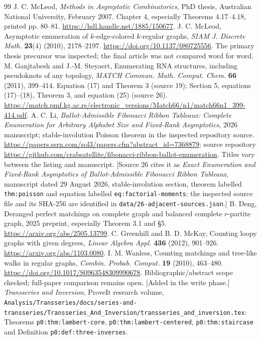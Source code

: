 \documentclass[11pt,letterpaper]{article}
\theoremstyle{remark}\newtheorem{remark}[theorem]{Remark}
\begin{document}
\begin{thebibliography}{99}
 J. C. McLeod, \emph{Methods in Asymptotic Combinatorics}, PhD thesis, Australian National University, February 2007. Chapter 4, especially Theorems 4.17--4.18, printed pp. 80--81. \url{https://hdl.handle.net/1885/150677}.
 J. C. McLeod, Asymptotic enumeration of $k$-edge-colored $k$-regular graphs, \emph{SIAM J. Discrete Math.} \textbf{23}(4) (2010), 2178--2197. \url{https://doi.org/10.1137/080725556}. The primary thesis precursor was inspected; the final article was not compared word for word.
 M. Ganjtabesh and J.-M. Steyaert, Enumerating RNA structures, including pseudoknots of any topology, \emph{MATCH Commun. Math. Comput. Chem.} \textbf{66} (2011), 399--414. Equation (17) and Theorem 3 (source 19); Section 5, equations (17)--(18), Theorem 3, and equation (25) (source 26). \url{https://match.pmf.kg.ac.rs/electronic_versions/Match66/n1/match66n1_399-414.pdf}.
 A. C. Li, \emph{Ballot-Admissible Fibonacci Ribbon Tableaux: Complete Enumeration for Arbitrary Alphabet Size and Fixed-Rank Asymptotics}, 2026 manuscript; stable-involution Poisson theorem in the inspected repository source. \url{https://papers.ssrn.com/sol3/papers.cfm?abstract_id=7368879}; source repository \url{https://github.com/crabsatellite/fibonacci-ribbon-ballot-enumeration}. Titles vary between the listing and manuscript. [Source 26 cites it as \emph{Exact Enumeration and Fixed-Rank Asymptotics of Ballot-Admissible Fibonacci Ribbon Tableaux}, manuscript dated 29 August 2026, stable-involution section, theorem labelled \texttt{thm:poisson} and equation labelled \texttt{eq:factorial-moments}; the inspected source file and its SHA-256 are identified in \texttt{data/26-adjacent-sources.json}.]
 B. Deng, Deranged perfect matchings on complete graph and balanced complete $r$-partite graph, 2025 preprint, especially Theorem 3.1 and \S5. \url{https://arxiv.org/abs/2505.13799}.
 C. Greenhill and B. D. McKay, Counting loopy graphs with given degrees, \emph{Linear Algebra Appl.} \textbf{436} (2012), 901--926. \url{https://arxiv.org/abs/1103.0080}.
 I. M. Wanless, Counting matchings and tree-like walks in regular graphs, \emph{Combin. Probab. Comput.} \textbf{19} (2010), 463--480. \url{https://doi.org/10.1017/S0963548309990678}. Bibliographic/abstract scope checked; full-paper comparison remains open.
 [Added in the write phase.] \emph{Transseries and Inversion}, ProveIt research volume, \texttt{Analysis/\allowbreak Transseries/\allowbreak docs/\allowbreak series-and-transseries/\allowbreak Transseries\_And\_Inversion/\allowbreak transseries\_and\_inversion.tex}: Theorems \texttt{p0:thm:lambert-core}, \texttt{p0:thm:lambert-centered}, \texttt{p0:thm:staircase} and Definition \texttt{p0:def:three-inverses}.

\end{thebibliography}
\end{document}
